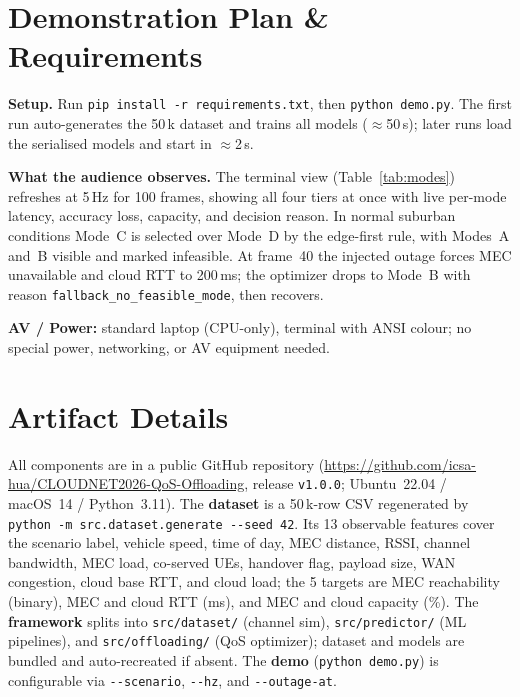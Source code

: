 \documentclass[10pt,conference]{IEEEtran}
\begin{document}
\section{Demonstration Plan \& Requirements}

\textbf{Setup.}
Run \texttt{pip install -r requirements.txt}, then \texttt{python demo.py}.
The first run auto-generates the 50\,k dataset and trains all models
($\approx$50\,s); later runs load the serialised models and start in
$\approx$2\,s.

\textbf{What the audience observes.}
The terminal view (Table~\ref{tab:modes}) refreshes at 5\,Hz for 100 frames,
showing all four tiers at once with live per-mode latency, accuracy loss,
capacity, and decision reason.  In normal suburban conditions Mode~C is
selected over Mode~D by the edge-first rule, with Modes~A and~B visible and
marked infeasible.  At frame~40 the injected outage forces MEC unavailable and
cloud RTT to 200\,ms; the optimizer drops to Mode~B with reason
\texttt{fallback\_no\_feasible\_mode}, then recovers.

\textbf{AV / Power:} standard laptop (CPU-only), terminal with ANSI colour;
no special power, networking, or AV equipment needed.

\section{Artifact Details}
\label{sec:artifact}

All components are in a public GitHub repository
(\url{https://github.com/icsa-hua/CLOUDNET2026-QoS-Offloading}, release
\texttt{v1.0.0}; Ubuntu~22.04 / macOS~14 / Python~3.11).  The
\textbf{dataset} is a 50\,k-row CSV regenerated by
\texttt{python -m src.dataset.generate -{}-seed 42}.  Its 13 observable
features cover the scenario label, vehicle speed, time of day, MEC distance,
RSSI, channel bandwidth, MEC load, co-served UEs, handover flag, payload size,
WAN congestion, cloud base RTT, and cloud load; the 5 targets are MEC
reachability (binary), MEC and cloud RTT (ms), and MEC and cloud capacity
(\%).  The
\textbf{framework} splits into \texttt{src/dataset/} (channel sim),
\texttt{src/predictor/} (ML pipelines), and \texttt{src/offloading/} (QoS
optimizer); dataset and models are bundled and auto-recreated if absent.  The
\textbf{demo} (\texttt{python demo.py}) is configurable via
\texttt{-{}-scenario}, \texttt{-{}-hz}, and \texttt{-{}-outage-at}.
\end{document}
